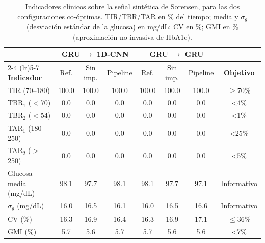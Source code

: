 \documentclass{report}
\begin{document}
\begin{table}[!htb]
\centering
\footnotesize
\caption{Indicadores clínicos sobre la señal sintética de Sorensen, para las dos configuraciones co-óptimas. TIR/TBR/TAR en \% del tiempo; media y $\sigma_g$ (desviación estándar de la glucosa) en mg/dL; CV en \%; GMI en \% (aproximación no invasiva de HbA1c).}
\label{tab:clinico_sorensen}
\begin{tabular}{lccc ccc c}
\toprule
& \multicolumn{3}{c}{GRU $\to$ 1D-CNN} & \multicolumn{3}{c}{GRU $\to$ GRU} & \\
\cmidrule(lr){2-4} \cmidrule(lr){5-7}
\textbf{Indicador} & Ref. & Sin imp. & Pipeline & Ref. & Sin imp. & Pipeline & \textbf{Objetivo} \\
\midrule
TIR (70--180)         & 100.0 & 100.0 & 100.0 & 100.0 & 100.0 & 100.0 & $\geq$70\% \\
TBR$_1$ ($<$70)       & 0.0   & 0.0   & 0.0   & 0.0   & 0.0   & 0.0   & <4\% \\
TBR$_2$ ($<$54)       & 0.0   & 0.0   & 0.0   & 0.0   & 0.0   & 0.0   & <1\% \\
TAR$_1$ (180--250)    & 0.0   & 0.0   & 0.0   & 0.0   & 0.0   & 0.0   & <25\% \\
TAR$_2$ ($>$250)      & 0.0   & 0.0   & 0.0   & 0.0   & 0.0   & 0.0   & <5\% \\
Glucosa media (mg/dL) & 98.1  & 97.7  & 98.1  & 98.1  & 97.7  & 97.1  & Informativo \\
$\sigma_g$ (mg/dL)       & 16.0  & 16.5  & 16.1  & 16.0  & 16.5  & 16.6  & Informativo \\
CV (\%)               & 16.3  & 16.9  & 16.4  & 16.3  & 16.9  & 17.1  & $\leq$36\% \\
GMI (\%)              & 5.7   & 5.6   & 5.7   & 5.7   & 5.6   & 5.6   & <7\% \\
\bottomrule
\end{tabular}
\end{table}
\end{document}
